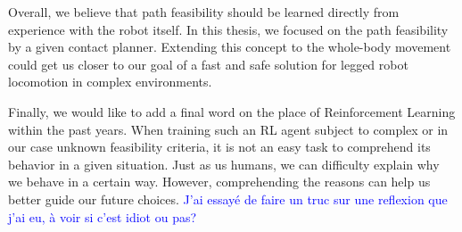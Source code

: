 Overall, we believe that path feasibility should be learned directly from experience with the robot itself.
In this thesis, we focused on the path feasibility by a given contact planner. Extending this concept to the whole-body movement could get us closer to our goal of a fast and safe solution for legged robot locomotion in complex environments.

Finally, we would like to add a final word on the place of Reinforcement Learning within the past years.
When training such an RL agent subject to complex or in our case unknown feasibility criteria, it is not an easy task to comprehend its behavior in a given situation.
Just as us humans, we can difficulty explain why we behave in a certain way. However, comprehending the reasons can help us better guide our future choices.
\textcolor{blue}{J'ai essayé de faire un truc sur une reflexion que j'ai eu, à voir si c'est idiot ou pas?}




